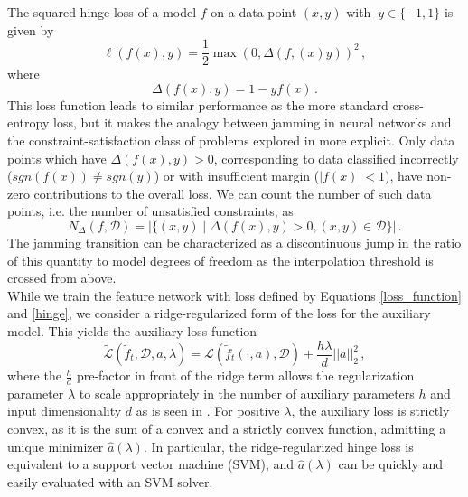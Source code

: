 \documentclass[11pt]{article}
\begin{document}
The squared-hinge loss of a model $f$ on a data-point $(x,y)$ with  $\ y\in \{-1,1\}$ is given by
\begin{equation}
    \ell(f(x), y) = \frac{1}{2}\max(0, \Delta(f,(x) y))^2\,,
    \label{hinge}
\end{equation}
where
\begin{equation}
    \Delta(f(x), y) = 1 - yf(x)\,.
\end{equation}
This loss function leads to similar performance as the more standard cross-entropy loss, but it makes the analogy between jamming in neural networks and the constraint-satisfaction class of problems explored in \cite{krzakalaLandscapeAnalysisConstraint2007} more explicit. Only data points which have $\Delta(f(x), y) > 0$, corresponding to data classified incorrectly ($ sgn(f(x)) \neq sgn(y)$) or with insufficient margin ($|f(x)| < 1$), have non-zero contributions to the overall loss. We can count the number of such data points, i.e. the number of unsatisfied constraints, as 
\begin{equation}
    N_\Delta(f, \mathcal D) = \left|\{(x, y) \mid \Delta(f(x), y) > 0, (x,y) \in \mathcal D\}\right|\,.
\end{equation}
The jamming transition can be characterized as a discontinuous jump in the ratio of this quantity to model degrees of freedom as the interpolation threshold is crossed from above. \\

While we train the feature network with loss defined by Equations \eqref{loss_function} and \eqref{hinge}, we consider a ridge-regularized form of the loss for the auxiliary model. This yields the auxiliary loss function
\begin{equation}
    \tilde{\mathcal{L}} (\tilde f_t, \mathcal D, a, \lambda) = \mathcal L (\tilde f_t(\cdot, a), \mathcal D) + \frac{h \lambda}{d} ||a||_2^2\,,
\end{equation}
where the $\frac{h}{d}$ pre-factor in front of the ridge term allows the regularization parameter $\lambda$ to scale appropriately in the number of auxiliary parameters $h$ and input dimensionality $d$ as is seen in \cite{meiGeneralizationErrorRandom2019}. For positive $\lambda$, the auxiliary loss is strictly convex, as it is the sum of a convex and a strictly convex function, admitting a unique minimizer $\hat a(\lambda)$. In particular, the ridge-regularized hinge loss is equivalent to a support vector machine (SVM), and $\hat a(\lambda)$ can be quickly and easily evaluated with an SVM solver. 
\end{document}

